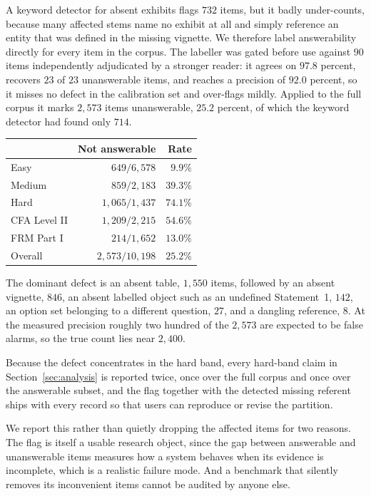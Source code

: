 A keyword detector for absent exhibits flags $732$ items, but it badly under-counts, because many
affected stems name no exhibit at all and simply reference an entity that was defined in the
missing vignette. We therefore label answerability directly for every item in the corpus. The
labeller was gated before use against $90$ items independently adjudicated by a stronger reader:
it agrees on $97.8$ percent, recovers $23$ of $23$ unanswerable items, and reaches a precision of
$92.0$ percent, so it misses no defect in the calibration set and over-flags mildly. Applied to
the full corpus it marks $2{,}573$ items unanswerable, $25.2$ percent, of which the keyword
detector had found only $714$.

\begin{center}
\small
\begin{tabular}{lrr}
\toprule
& \textbf{Not answerable} & \textbf{Rate} \\
\midrule
Easy   & $649/6{,}578$   & $9.9\%$ \\
Medium & $859/2{,}183$   & $39.3\%$ \\
Hard   & $1{,}065/1{,}437$ & $74.1\%$ \\
\midrule
CFA Level II & $1{,}209/2{,}215$ & $54.6\%$ \\
FRM Part I   & $214/1{,}652$     & $13.0\%$ \\
\midrule
Overall & $2{,}573/10{,}198$ & $25.2\%$ \\
\bottomrule
\end{tabular}
\end{center}

The dominant defect is an absent table, $1{,}550$ items, followed by an absent vignette, $846$,
an absent labelled object such as an undefined Statement~1, $142$, an option set belonging to a
different question, $27$, and a dangling reference, $8$. At the measured precision roughly two
hundred of the $2{,}573$ are expected to be false alarms, so the true count lies near $2{,}400$.

Because the defect concentrates in the hard band, every hard-band claim in
Section~\ref{sec:analysis} is reported twice, once over the full corpus and once over the
answerable subset, and the flag together with the detected missing referent ships with every
record so that users can reproduce or revise the partition.

We report this rather than quietly dropping the affected items for two reasons. The flag is
itself a usable research object, since the gap between answerable and unanswerable items measures
how a system behaves when its evidence is incomplete, which is a realistic failure mode. And a
benchmark that silently removes its inconvenient items cannot be audited by anyone else.

